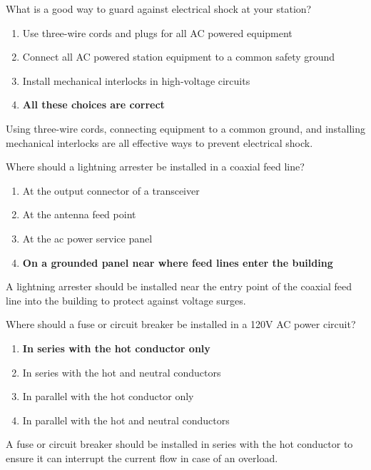 
\begin{tcolorbox}[colback=gray!10!white,colframe=black!75!black,title={T0A06}]
    What is a good way to guard against electrical shock at your station?
    \begin{enumerate}[label=\Alph*),noitemsep]
        \item Use three-wire cords and plugs for all AC powered equipment
        \item Connect all AC powered station equipment to a common safety ground
        \item Install mechanical interlocks in high-voltage circuits
        \item \textbf{All these choices are correct}
    \end{enumerate}
\end{tcolorbox}
Using three-wire cords, connecting equipment to a common ground, and installing mechanical interlocks are all effective ways to prevent electrical shock.


\begin{tcolorbox}[colback=gray!10!white,colframe=black!75!black,title={T0A07}]
    Where should a lightning arrester be installed in a coaxial feed line?
    \begin{enumerate}[label=\Alph*),noitemsep]
        \item At the output connector of a transceiver
        \item At the antenna feed point
        \item At the ac power service panel
        \item \textbf{On a grounded panel near where feed lines enter the building}
    \end{enumerate}
\end{tcolorbox}
A lightning arrester should be installed near the entry point of the coaxial feed line into the building to protect against voltage surges.


\begin{tcolorbox}[colback=gray!10!white,colframe=black!75!black,title={T0A08}]
    Where should a fuse or circuit breaker be installed in a 120V AC power circuit?
    \begin{enumerate}[label=\Alph*),noitemsep]
        \item \textbf{In series with the hot conductor only}
        \item In series with the hot and neutral conductors
        \item In parallel with the hot conductor only
        \item In parallel with the hot and neutral conductors
    \end{enumerate}
\end{tcolorbox}
A fuse or circuit breaker should be installed in series with the hot conductor to ensure it can interrupt the current flow in case of an overload.

